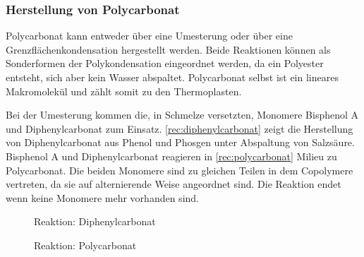 \subsubsection{Herstellung von Polycarbonat}

Polycarbonat kann entweder über eine Umesterung oder über eine
Grenzflächenkondensation hergestellt werden. Beide Reaktionen können als
Sonderformen der Polykondensation eingeordnet werden, da ein Polyester entsteht,
sich aber kein Wasser abspaltet. Polycarbonat selbst ist ein lineares
Makromolekül und zählt somit zu den Thermoplasten.

Bei der Umesterung kommen die, in Schmelze versetzten, Monomere Bisphenol A und
Diphenylcarbonat zum Einsatz. \autoref{rec:diphenylcarbonat} zeigt die
Herstellung von Diphenylcarbonat aus Phenol und Phosgen unter Abspaltung von
Salzsäure. Bisphenol A und Diphenylcarbonat reagieren in
\autoref{rec:polycarbonat} Milieu zu Polycarbonat. Die beiden Monomere sind zu
gleichen Teilen in dem Copolymere vertreten, da sie auf alternierende Weise
angeordnet sind. Die Reaktion endet wenn keine Monomere mehr vorhanden sind.

\begin{figure}[h]
    \begin{center}
        \footnotesize
        \setatomsep{1.7em}

        \chemsign{+}
        \chemrel{->}
        \chemsign{+}

        \caption{Reaktion: Diphenylcarbonat}
        \label{rec:diphenylcarbonat}
    \end{center}
\end{figure}

\begin{figure}[h]
    \begin{center}
        \footnotesize
        \setatomsep{1.7em}


        \vspace{10pt}

        \chemrel{->}

        \caption{Reaktion: Polycarbonat}
        \label{rec:polycarbonat}
    \end{center}
\end{figure}

